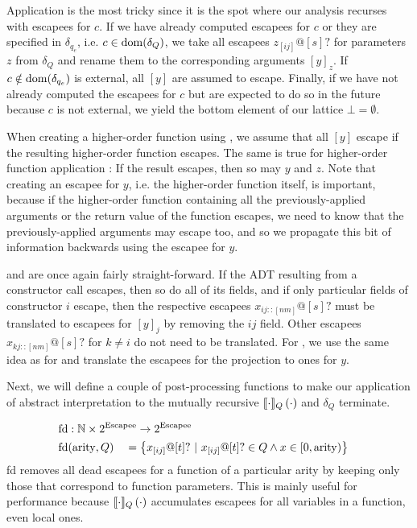 Application  is the most tricky since it is the spot where our analysis recurses with escapees for $c$. If we have already computed escapees for $c$ or they are specified in $\delta_{q_e}$, i.e. $c \in \mathrm{dom}(\delta_Q)$, we take all escapees $z_{[ij]}@[s]?$ for parameters $z$ from $\delta_Q$ and rename them to the corresponding arguments $[y]_z$. If $c \notin \mathrm{dom}(\delta_{q_e})$ is external, all $[y]$ are assumed to escape. Finally, if we have not already computed the escapees for $c$ but are expected to do so in the future because $c$ is not external, we yield the bottom element of our lattice $\bot = \emptyset$.

When creating a higher-order function using , we assume that all $[y]$ escape if the resulting higher-order function escapes. The same is true for higher-order function application : If the result escapes, then so may $y$ and $z$. Note that creating an escapee for $y$, i.e. the higher-order function itself, is important, because if the higher-order function containing all the previously-applied arguments or the return value of the function escapes, we need to know that the previously-applied arguments may escape too, and so we propagate this bit of information backwards using the escapee for $y$.

 and  are once again fairly straight-forward. If the ADT resulting from a constructor call escapes, then so do all of its fields, and if only particular fields of constructor $i$ escape, then the respective escapees $x_{ij :: [nm]} @ [s]?$ must be translated to escapees for $[y]_j$ by removing the $ij$ field. Other escapees $x_{kj :: [nm]} @ [s]?$ for $k \neq i$ do not need to be translated.
For , we use the same idea as for  and translate the escapees for the projection to ones for $y$.

Next, we will define a couple of post-processing functions to make our application of abstract interpretation to the mutually recursive $\llbracket {\cdot} \rrbracket_Q \left( {\cdot} \right)$ and $\delta_Q$ terminate. 

\newcommand{\fd}{\mathrm{fd}}
\newcommand{\ct}{\mathrm{ct}}
\newcommand{\fs}{\mathrm{fs}}

\newcommand{\collapse}{\mathrm{collapse}}

\begin{alignat*}{3}
	\fd &: \mathrlap{\mathbb{N} \times 2^{\Escapee} \to 2^{\Escapee}} \\
	\fd&(\mathrm{arity}, Q) &&= \left\{x_{[ij]}@[t]? \ |\ x_{[ij]}@[t]? \in Q \land x \in [0, \mathrm{arity}) \right\}
\end{alignat*}
fd removes all dead escapees for a function of a particular arity by keeping only those that correspond to function parameters. This is mainly useful for performance because $\llbracket {\cdot} \rrbracket_Q \left( {\cdot} \right)$ accumulates escapees for all variables in a function, even local ones.

